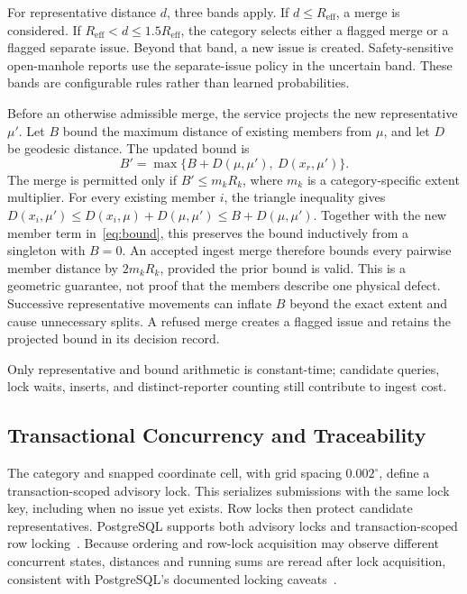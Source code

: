\documentclass[conference,a4paper]{IEEEtran}
\begin{document}
For representative distance $d$, three bands apply. If $d\leq R_{\mathrm{eff}}$, a merge is considered. If $R_{\mathrm{eff}}<d\leq1.5R_{\mathrm{eff}}$, the category selects either a flagged merge or a flagged separate issue. Beyond that band, a new issue is created. Safety-sensitive open-manhole reports use the separate-issue policy in the uncertain band. These bands are configurable rules rather than learned probabilities.

Before an otherwise admissible merge, the service projects the new representative $\mu'$. Let $B$ bound the maximum distance of existing members from $\mu$, and let $D$ be geodesic distance. The updated bound is
\begin{equation}
 B'=\max\{B+D(\mu,\mu'),\ D(x_r,\mu')\}.
 \label{eq:bound}
\end{equation}
The merge is permitted only if $B'\leq m_kR_k$, where $m_k$ is a category-specific extent multiplier. For every existing member $i$, the triangle inequality gives $D(x_i,\mu')\leq D(x_i,\mu)+D(\mu,\mu')\leq B+D(\mu,\mu')$. Together with the new member term in~\eqref{eq:bound}, this preserves the bound inductively from a singleton with $B=0$. An accepted ingest merge therefore bounds every pairwise member distance by $2m_kR_k$, provided the prior bound is valid. This is a geometric guarantee, not proof that the members describe one physical defect. Successive representative movements can inflate $B$ beyond the exact extent and cause unnecessary splits. A refused merge creates a flagged issue and retains the projected bound in its decision record.

Only representative and bound arithmetic is constant-time; candidate queries, lock waits, inserts, and distinct-reporter counting still contribute to ingest cost.

\subsection{Transactional Concurrency and Traceability}
The category and snapped coordinate cell, with grid spacing $0.002^\circ$, define a transaction-scoped advisory lock. This serializes submissions with the same lock key, including when no issue yet exists. Row locks then protect candidate representatives. PostgreSQL supports both advisory locks and transaction-scoped row locking~\cite{pglocks}. Because ordering and row-lock acquisition may observe different concurrent states, distances and running sums are reread after lock acquisition, consistent with PostgreSQL's documented locking caveats~\cite{pgselect}.
\end{document}
